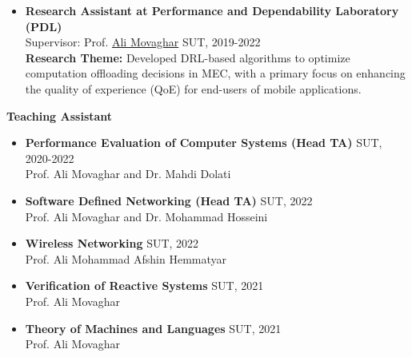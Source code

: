 \documentclass[11pt]{article}
\begin{document}
\normalsize
\begin{itemize}
	\item \textbf{Research Assistant at Performance and Dependability Laboratory (PDL)} \href{https://pdl.ce.sharif.edu}{\small \faExternalLink}
	\\ Supervisor: Prof. \href{https://scholar.google.com/citations?user=BXNelwwAAAAJ\&hl=en}{Ali Movaghar} \hfill SUT, 2019-2022\\
\textbf{Research Theme:} Developed DRL-based algorithms to optimize computation offloading decisions in MEC, with a primary focus on enhancing the quality of experience (QoE) for end-users of mobile applications.

	
\end{itemize}
\large\large\textbf{Teaching Assistant}  \vspace{-2mm}
\normalsize

\begin{itemize}
	


	\item \textbf{Performance Evaluation of Computer Systems (Head TA)} \hfill SUT, 2020-2022
		\\ Prof. Ali Movaghar and Dr. Mahdi Dolati \vspace{-2mm} \href{https://scholar.google.com/citations?user=b7A2CXYAAAAJ&hl=en&oi=ao}{\small \faExternalLink}
	\item \textbf{Software Defined Networking (Head TA)} \hfill SUT, 2022
		\\ Prof. Ali Movaghar and Dr. Mohammad Hosseini \vspace{-2mm} \href{https://scholar.google.com/citations?user=iRO-DVoAAAAJ&hl=en&oi=ao}{\small \faExternalLink}
		\item \textbf{Wireless Networking} \hfill SUT, 2022
	\\ Prof. Ali Mohammad Afshin Hemmatyar \vspace{-2mm} \href{https://scholar.google.com/citations?user=wob0AskAAAAJ&hl=en&oi=ao}{\small \faExternalLink}
	\item \textbf{Verification of Reactive Systems} \hfill SUT, 2021
		\\ Prof. Ali Movaghar \vspace{-2mm}
	\item \textbf{Theory of Machines and Languages} \hfill SUT, 2021
		\\ Prof. Ali Movaghar \vspace{-2mm}

		

\end{itemize}
\end{document}
